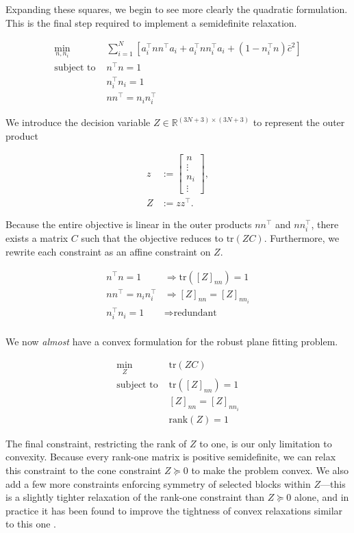 \documentclass[conference]{IEEEtran}
\begin{document}
Expanding these squares, we begin to see more clearly the quadratic formulation.  This is the final step required to implement a semidefinite relaxation.

\begin{align}
	\min_{n, n_i} \; & \sum_{i = 1}^N \left[ a_i^\top n n^\top a_i + a_i^\top n n_i^\top a_i + (1 - n_i^\top n) \bar{c}^2 \right] \\
	\text{subject to } & n^\top n = 1 \\
	& n_i^\top n_i = 1 \\
	& n n^\top = n_i n_i^\top
\end{align}

We introduce the decision variable \( Z \in \mathbb{R}^{(3N + 3) \times (3N + 3)} \) to represent the outer product

\begin{align}
	z &:= \begin{bmatrix}
		n \\
		\vdots \\
		n_i \\
		\vdots
	\end{bmatrix} , \\
	Z &:= z z^\top .
\end{align}

Because the entire objective is linear in the outer products \( n n^\top \) and \( n n_i^\top \), there exists a matrix \( C \) such that the objective reduces to \( \mathrm{tr}(ZC) \).  Furthermore, we rewrite each constraint as an affine constraint on \( Z \).

\begin{align}
	n^\top n = 1 &\Rightarrow \mathrm{tr}([Z]_{n n}) = 1 \\
	n n^\top = n_i n_i^\top &\Rightarrow [Z]_{n n} = [Z]_{n n_i} \\
	n_i^\top n_i = 1 &\Rightarrow \text{redundant} \\
\end{align}

We now \textit{almost} have a convex formulation for the robust plane fitting problem.

\begin{align}
	\min_Z \; & \mathrm{tr}(ZC) \\
	\text{subject to } & \mathrm{tr}([Z]_{n n}) = 1 \\
	& [Z]_{n n} = [Z]_{n n_i} \\
	& \mathrm{rank}(Z) = 1
\end{align}

The final constraint, restricting the rank of \( Z \) to one, is our only limitation to convexity.  Because every rank-one matrix is positive semidefinite, we can relax this constraint to the cone constraint \( Z \succeq 0 \) to make the problem convex.  We also add a few more constraints enforcing symmetry of selected blocks within \( Z \)---this is a slightly tighter relaxation of the rank-one constraint than \( Z \succeq 0 \) alone, and in practice it has been found to improve the tightness of convex relaxations similar to this one \cite{quasar}.
\end{document}
